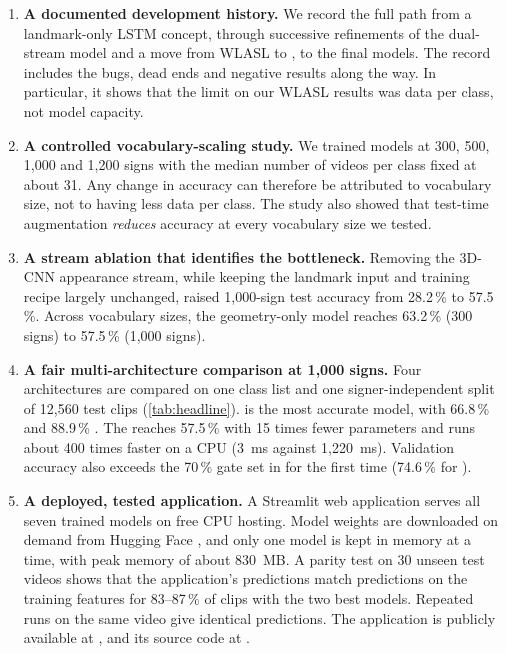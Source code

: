 \begin{enumerate}[leftmargin=2em]
  \item \textbf{A documented development history.} We record the full path
  from a landmark-only LSTM concept, through successive refinements of the
  dual-stream model and a move from WLASL to \aslc{}, to the final models. The
  record includes the bugs, dead ends and negative results along the way.
  In particular, it shows that the limit on our WLASL results was data
  per class, not model capacity.

  \item \textbf{A controlled vocabulary-scaling study.} We trained models
  at 300, 500, 1,000 and 1,200 signs with the median number of videos per
  class fixed at about 31. Any change in accuracy can therefore be
  attributed to vocabulary size, not to having less data per class. The
  study also showed that test-time augmentation \emph{reduces} accuracy at
  every vocabulary size we tested.

  \item \textbf{A stream ablation that identifies the bottleneck.}
  Removing the 3D-CNN appearance stream, while keeping the landmark input
  and training recipe largely unchanged, raised 1,000-sign test
  \topone{} accuracy from 28.2\,\% to 57.5\,\%. Across vocabulary sizes,
  the geometry-only model reaches 63.2\,\% (300 signs) to 57.5\,\%
  (1,000 signs).

  \item \textbf{A fair multi-architecture comparison at 1,000 signs.}
  Four architectures are compared on one class list and one
  signer-independent split of 12,560 test clips (\cref{tab:headline}).
  \swin{} is the most accurate model, with 66.8\,\% \topone{} and
  88.9\,\% \topfive{}. The \geotr{} reaches 57.5\,\% with 15 times
  fewer parameters and runs about 400 times faster on a CPU (3~ms against
  1,220~ms). Validation \topone{} accuracy also exceeds the 70\,\% gate
  set in \capA{} for the first time (74.6\,\% for \swin{}).

  \item \textbf{A deployed, tested application.} A Streamlit web
  application \cite{streamlit2026} serves all seven trained models on
  free CPU hosting. Model weights are downloaded on demand from Hugging
  Face \cite{huggingface2026hub}, and only one model is kept in memory at
  a time, with peak memory of about 830~MB. A parity test on 30 unseen
  test videos shows that the application's predictions match predictions
  on the training features for 83--87\,\% of clips with the two best
  models. Repeated runs on the same video give identical predictions.
  The application is publicly available at \AppURL{}, and its source code
  at \RepoURL{}.
\end{enumerate}

